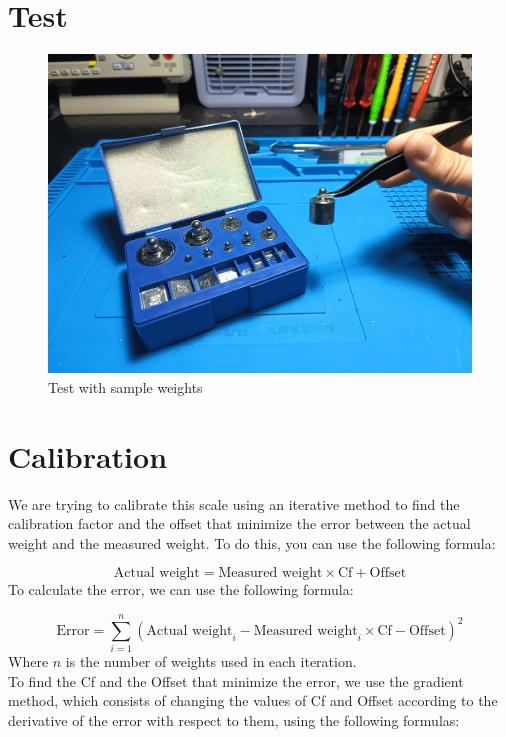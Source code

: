 \section{Test}


\begin{figure}[h]
\centering
\includegraphics[width=\textwidth]{medias/parts/sample_weights.jpeg}
\caption{Test with sample weights}
\end{figure}
\clearpage

\section{Calibration}

We are trying to calibrate this scale using an iterative method to find the calibration factor and the offset that minimize the error between the actual weight and the measured weight. To do this, you can use the following formula:

\[
\text{Actual weight} = \text{Measured weight} \times \text{Cf} + \text{Offset}
\]
\noindent
To calculate the error, we can use the following formula:

\[
\text{Error} = \sum_{i=1}^{n} (\text{Actual weight}_i - \text{Measured weight}_i \times \text{Cf} - \text{Offset})^2
\]
\noindent
Where $n$ is the number of weights used in each iteration.\\
To find the Cf and the Offset that minimize the error, we use the gradient method, which consists of changing the values of Cf and Offset according to the derivative of the error with respect to them, using the following formulas:

